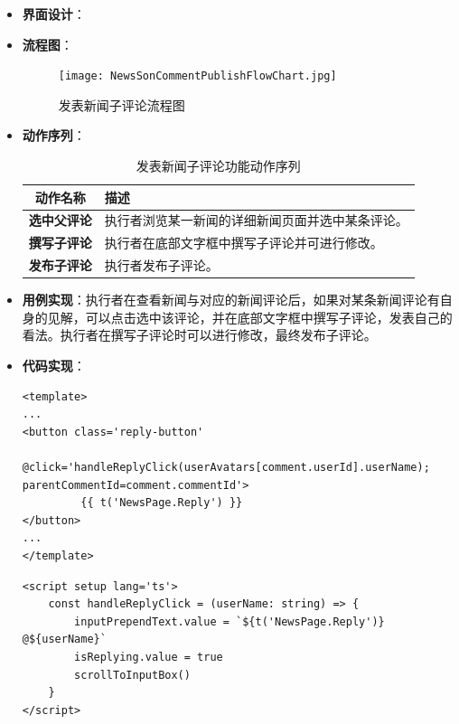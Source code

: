 \begin{itemize}
	\item \textbf{界面设计}：
	\item \textbf{流程图}：
	\begin{figure}[H]
		\centering
		\texttt{[image: NewsSonCommentPublishFlowChart.jpg]}
		\caption{发表新闻子评论流程图}
		\label{NewsSonCommentPublishFlowChart}
	\end{figure}
	\item \textbf{动作序列}：
	\begin{table}[H]
		\centering
		\caption{发表新闻子评论功能动作序列}
		\renewcommand\arraystretch{1.5}
		\begin{tabular}{|c|>{\raggedright\arraybackslash}p{10cm}|}
			\hline
			\textbf{动作名称} & \textbf{描述} \\ \hline
			\textbf{选中父评论} & 执行者浏览某一新闻的详细新闻页面并选中某条评论。 \\ \hline
			\textbf{撰写子评论} & 执行者在底部文字框中撰写子评论并可进行修改。 \\ \hline
			\textbf{发布子评论} & 执行者发布子评论。 \\ \hline
		\end{tabular}
	\end{table}
	\item \textbf{用例实现}：执行者在查看新闻与对应的新闻评论后，如果对某条新闻评论有自身的见解，可以点击选中该评论，并在底部文字框中撰写子评论，发表自己的看法。执行者在撰写子评论时可以进行修改，最终发布子评论。
	\item \textbf{代码实现}：
	\begin{verbatim}
<template>
...
<button class='reply-button'
       @click='handleReplyClick(userAvatars[comment.userId].userName); parentCommentId=comment.commentId'>
         {{ t('NewsPage.Reply') }}
</button>
...
</template>
	\end{verbatim}
	
	\begin{verbatim}
<script setup lang='ts'>
	const handleReplyClick = (userName: string) => {
		inputPrependText.value = `${t('NewsPage.Reply')} @${userName}`
		isReplying.value = true
		scrollToInputBox()
	}
</script>
	\end{verbatim}
\end{itemize}

